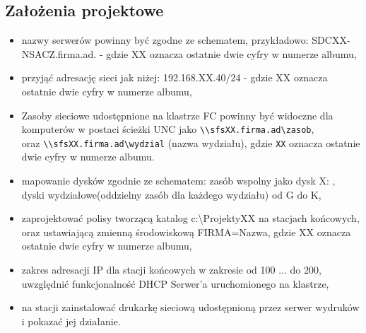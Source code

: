 \subsection{Założenia projektowe}
\begin{itemize}
    \item nazwy serwerów powinny być zgodne ze schematem, przykładowo: SDCXX-NSACZ.firma.ad. - gdzie
XX oznacza ostatnie dwie cyfry w numerze albumu, 
    \item przyjąć adresację sieci jak niżej: 192.168.XX.40/24 - gdzie XX oznacza ostatnie dwie cyfry w numerze albumu, 
    \item Zasoby sieciowe udostępnione na klastrze FC powinny być widoczne dla komputerów w postaci ścieżki UNC jako \texttt{\textbackslash\textbackslash sfsXX.firma.ad\textbackslash zasob}, \\ oraz \texttt{\textbackslash\textbackslash sfsXX.firma.ad\textbackslash wydzial} (nazwa wydziału), gdzie \texttt{XX} oznacza ostatnie dwie cyfry w numerze albumu.
    \item mapowanie dysków zgodnie ze schematem:
zasób wspolny jako dysk X: , dyski wydziałowe(oddzielny zasób dla każdego wydziału) od G do K, 
    \item  zaprojektować polisy tworzącą katalog c:\textbackslash ProjektyXX na stacjach końcowych, oraz ustawiającą
zmienną środowiskową FIRMA=Nazwa, gdzie XX oznacza ostatnie dwie cyfry w numerze albumu, 
    \item zakres adresacji IP dla stacji końcowych w zakresie od 100 ... do 200, uwzględnić funkcjonalność DHCP Serwer’a uruchomionego na klastrze, 
    \item na stacji zainstalować drukarkę sieciową udostępnioną przez serwer wydruków i pokazać jej
działanie.
\end{itemize}